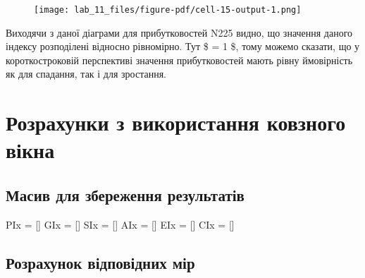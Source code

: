 \documentclass[
  letterpaper,
]{report}
\newenvironment{Shaded}{\begin{snugshade}}{\end{snugshade}}
\newcommand{\NormalTok}[1]{\textcolor[rgb]{0.00,0.23,0.31}{#1}}
\newcommand{\OperatorTok}[1]{\textcolor[rgb]{0.37,0.37,0.37}{#1}}
\begin{document}
\begin{figure}[H]

{\centering \texttt{[image: lab\_11\_files/figure-pdf/cell-15-output-1.png]}

}

\end{figure}

Виходячи з даної діаграми для прибутковостей N225 видно, що значення
даного індексу розподілені відносно рівномірно. Тут \$ \tau = 1 \$, тому
можемо сказати, що у короткостроковій перспективі значення
прибутковостей мають рівну ймовірність як для спадання, так і для
зростання.

\hypertarget{ux440ux43eux437ux440ux430ux445ux443ux43dux43aux438-ux437-ux432ux438ux43aux43eux440ux438ux441ux442ux430ux43dux43dux44f-ux43aux43eux432ux437ux43dux43eux433ux43e-ux432ux456ux43aux43dux430}{%
\section{Розрахунки з використання ковзного
вікна}\label{ux440ux43eux437ux440ux430ux445ux443ux43dux43aux438-ux437-ux432ux438ux43aux43eux440ux438ux441ux442ux430ux43dux43dux44f-ux43aux43eux432ux437ux43dux43eux433ux43e-ux432ux456ux43aux43dux430}}

\hypertarget{ux43cux430ux441ux438ux432-ux434ux43bux44f-ux437ux431ux435ux440ux435ux436ux435ux43dux43dux44f-ux440ux435ux437ux443ux43bux44cux442ux430ux442ux456ux432}{%
\subsection{Масив для збереження
результатів}\label{ux43cux430ux441ux438ux432-ux434ux43bux44f-ux437ux431ux435ux440ux435ux436ux435ux43dux43dux44f-ux440ux435ux437ux443ux43bux44cux442ux430ux442ux456ux432}}

\begin{Shaded}
\begin{Highlighting}[]
\NormalTok{PIx }\OperatorTok{=}\NormalTok{ []}
\NormalTok{GIx }\OperatorTok{=}\NormalTok{ []}
\NormalTok{SIx }\OperatorTok{=}\NormalTok{ []}
\NormalTok{AIx }\OperatorTok{=}\NormalTok{ []}
\NormalTok{EIx }\OperatorTok{=}\NormalTok{ []}
\NormalTok{CIx }\OperatorTok{=}\NormalTok{ []}
\end{Highlighting}
\end{Shaded}

\hypertarget{ux440ux43eux437ux440ux430ux445ux443ux43dux43eux43a-ux432ux456ux434ux43fux43eux432ux456ux434ux43dux438ux445-ux43cux456ux440}{%
\subsection{Розрахунок відповідних
мір}\label{ux440ux43eux437ux440ux430ux445ux443ux43dux43eux43a-ux432ux456ux434ux43fux43eux432ux456ux434ux43dux438ux445-ux43cux456ux440}}
\end{document}
